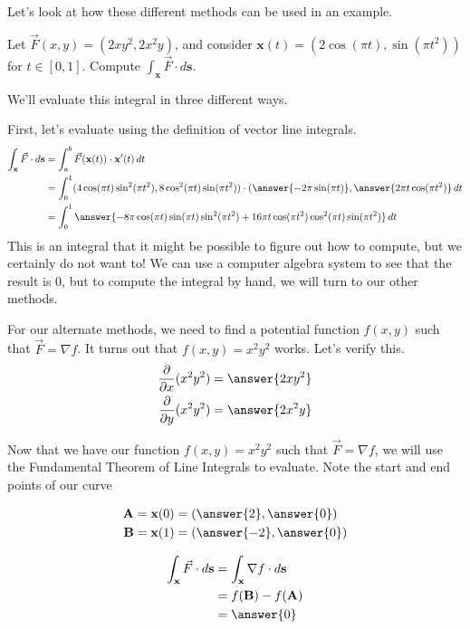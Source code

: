 \documentclass{ximera}
\begin{document}
Let's look at how these different methods can be used in an example.

\begin{example}
Let $\vec{F}(x,y) = (2xy^2, 2x^2y)$, and consider $\textbf{x}(t)=(2\cos(\pi t),\sin(\pi t^2))$ for $t\in [0,1]$. Compute $\int_{\textbf{x}}\vec{F}\cdot d\textbf{s}$.
\begin{explanation}
We'll evaluate this integral in three different ways.

First, let's evaluate using the definition of vector line integrals.
\begin{align*}
\int_{\textbf{x}}\vec{F}\cdot d\textbf{s} &= \int_a^b\vec{F}(\textbf{x}(t))\cdot \textbf{x}'(t)\,dt\\
&= \int_0^1(4\cos(\pi t)\sin^2(\pi t^2), 8\cos^2(\pi t)\sin(\pi t^2))\cdot (\answer{-2\pi\sin(\pi t)}, \answer{2\pi t\cos(\pi t^2)}\,dt\\
&= \int_0^1\answer{-8\pi\cos(\pi t)\sin(\pi t)\sin^2(\pi t^2) + 16\pi t\cos(\pi t^2)\cos^2(\pi t)\sin(\pi t^2)}\,dt
\end{align*}
This is an integral that it might be possible to figure out how to compute, but we certainly do not want to! We can use a computer algebra system to see that the result is $0$, but to compute the integral by hand, we will turn to our other methods.

For our alternate methods, we need to find a potential function $f(x,y)$ such that $\vec{F}=\nabla f$. It turns out that $f(x,y)=x^2y^2$ works. Let's verify this.
\begin{align*}
\frac{\partial}{\partial x} (x^2y^2) &= \answer{2xy^2}\\
\frac{\partial}{\partial y} (x^2y^2) &= \answer{2x^2y}\\
\end{align*}

Now that we have our function $f(x,y)=x^2y^2$ such that $\vec{F}=\nabla f$, we will use the Fundamental Theorem of Line Integrals to evaluate. Note the start and end points of our curve

\begin{align*}
\textbf{A} &= \textbf{x}(0) = (\answer{2}, \answer{0})\\
\textbf{B} &= \textbf{x}(1) = (\answer{-2}, \answer{0})\\
\end{align*}

\begin{align*}
\int_{\textbf{x}}\vec{F}\cdot d\textbf{s} &= \int_{\textbf{x}}\nabla f\cdot d\textbf{s}\\
&= f(\textbf{B})-f(\textbf{A})\\
&= \answer{0}
\end{align*}


\end{explanation}
\end{example}
\end{document}
